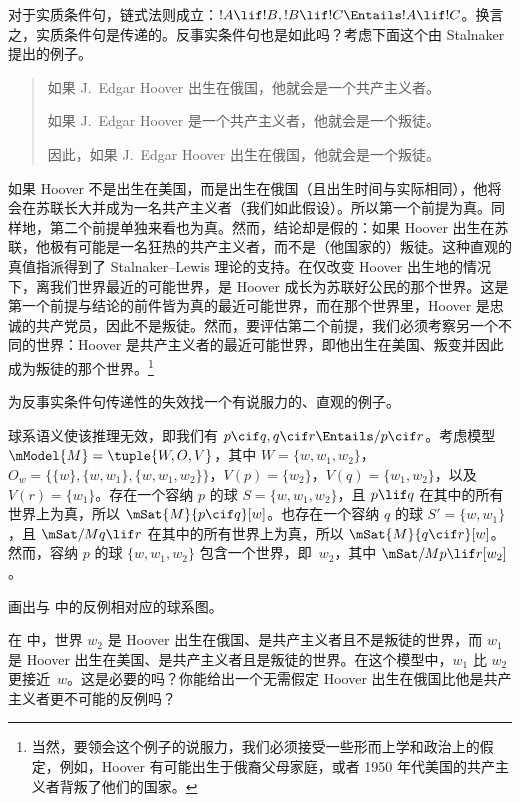 \documentclass[../../../include/open-logic-section]{subfiles}
\begin{document}


对于实质条件句，链式法则成立：$!A \lif !B, !B
\lif !C \Entails !A \lif !C$。换言之，实质条件句是传递的。反事实条件句也是如此吗？考虑下面这个由 Stalnaker 提出的例子。
\begin{quote}
  如果 J.~Edgar Hoover 出生在俄国，他就会是一个共产主义者。

  如果 J.~Edgar Hoover 是一个共产主义者，他就会是一个叛徒。

  因此，如果 J.~Edgar Hoover 出生在俄国，他就会是一个叛徒。
\end{quote}
如果 Hoover 不是出生在美国，而是出生在俄国（且出生时间与实际相同），他将会在苏联长大并成为一名共产主义者（我们如此假设）。所以第一个前提为真。同样地，第二个前提单独来看也为真。然而，结论却是假的：如果 Hoover 出生在苏联，他极有可能是一名狂热的共产主义者，而不是（他国家的）叛徒。这种直观的真值指派得到了 Stalnaker–Lewis 理论的支持。在仅改变 Hoover 出生地的情况下，离我们世界最近的可能世界，是 Hoover 成长为苏联好公民的那个世界。这是第一个前提与结论的前件皆为真的最近可能世界，而在那个世界里，Hoover 是忠诚的共产党员，因此不是叛徒。然而，要评估第二个前提，我们必须考察另一个不同的世界：Hoover 是共产主义者的最近可能世界，即他出生在美国、叛变并因此成为叛徒的那个世界。\footnote{当然，要领会这个例子的说服力，我们必须接受一些形而上学和政治上的假定，例如，Hoover 有可能出生于俄裔父母家庭，或者 1950 年代美国的共产主义者背叛了他们的国家。}

\begin{prob}
  为反事实条件句传递性的失效找一个有说服力的、直观的例子。
\end{prob}

\begin{ex}
  球系语义使该推理无效，即我们有 $p
  \cif q, q \cif r \Entails/ p \cif r$。考虑模型 $\mModel{M}
  = \tuple{W, O, V}$，其中 $W = \{w, w_1, w_2\}$，$O_w = \{\{w\}, \{w,
  w_1\}, \{w, w_1, w_2\}\}$，$V(p) = \{w_2\}$，$V(q) = \{w_1, w_2\}$，以及 $V(r) = \{w_1\}$。存在一个容纳 $p$ 的球 $S = \{w, w_1,
  w_2\}$，且 $p \lif q$ 在其中的所有世界上为真，所以 $\mSat{M}{p
    \cif q}[w]$。也存在一个容纳 $q$ 的球 $S' = \{w,
  w_1\}$，且 $\mSat/{M}{q \lif r}$ 在其中的所有世界上为真，所以 $\mSat{M}{q \cif r}[w]$。然而，容纳 $p$ 的球 $\{w,
  w_1, w_2\}$ 包含一个世界，即~$w_2$，其中 $\mSat/{M}{p \lif
    r}[w_2]$。
\end{ex}

\begin{prob}
画出与  中的反例相对应的球系图。
\end{prob}

\begin{prob}
  在  中，世界 $w_2$ 是 Hoover 出生在俄国、是共产主义者且不是叛徒的世界，而 $w_1$ 是 Hoover 出生在美国、是共产主义者且是叛徒的世界。在这个模型中，$w_1$ 比 $w_2$ 更接近~$w$。这是必要的吗？你能给出一个无需假定 Hoover 出生在俄国比他是共产主义者更不可能的反例吗？
\end{prob}
\end{document}
